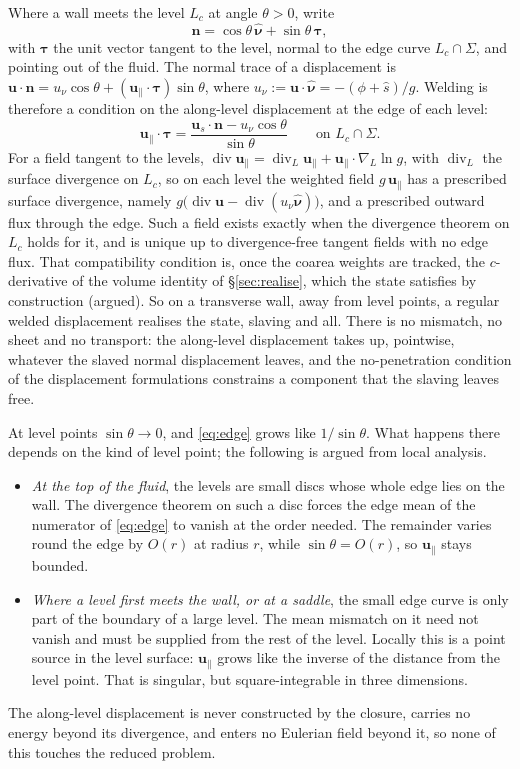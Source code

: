 \documentclass[11pt]{article}
\theoremstyle{definition}
\theoremstyle{remark}
\newcommand{\bu}{\mathbf{u}}
\newcommand{\bn}{\mathbf{n}}
\newcommand{\btau}{\boldsymbol{\tau}}
\newcommand{\Div}{\operatorname{div}}
\newcommand{\nuh}{\hat{\boldsymbol{\nu}}}
\begin{document}
Where a wall meets the level $L_c$ at angle $\theta > 0$, write
\begin{equation*}
  \bn = \cos\theta\,\nuh + \sin\theta\,\btau ,
\end{equation*}
with $\btau$ the unit vector tangent to the level, normal to the edge
curve $L_c\cap\Sigma$, and pointing out of the fluid. The normal trace
of a displacement is $\bu\cdot\bn = u_\nu\cos\theta +
(\bu_\parallel\cdot\btau)\sin\theta$, where $u_\nu := \bu\cdot\nuh =
-(\phi + \hat s)/g$. Welding is therefore a condition on the
along-level displacement at the edge of each level:
\begin{equation}
  \bu_\parallel\cdot\btau = \frac{\bu_s\cdot\bn - u_\nu\cos\theta}{\sin\theta}
  \qquad\text{on } L_c\cap\Sigma .
  \label{eq:edge}
\end{equation}
For a field tangent to the levels, $\Div\bu_\parallel =
\Div_L\bu_\parallel + \bu_\parallel\cdot\nabla_L\ln g$, with $\Div_L$
the surface divergence on $L_c$, so on each level the weighted field
$g\,\bu_\parallel$ has a prescribed surface divergence, namely
$g\bigl(\Div\bu - \Div(u_\nu\nuh)\bigr)$, and a prescribed outward flux
through the edge. Such a field exists exactly when the divergence
theorem on $L_c$ holds for it, and is unique up to divergence-free
tangent fields with no edge flux. That compatibility condition is,
once the coarea weights are tracked, the $c$-derivative of the volume
identity of \S\ref{sec:realise}, which the state satisfies by
construction (argued). So on a transverse wall, away from level
points, a regular welded displacement realises the state, slaving and
all. There is no mismatch, no sheet and no transport: the along-level
displacement takes up, pointwise, whatever the slaved normal
displacement leaves, and the no-penetration condition of the
displacement formulations constrains a component that the slaving
leaves free.

At level points $\sin\theta \to 0$, and \eqref{eq:edge} grows like
$1/\sin\theta$. What happens there depends on the kind of level point;
the following is argued from local analysis.
\begin{itemize}
\item \emph{At the top of the fluid}, the levels are small discs whose
  whole edge lies on the wall. The divergence theorem on such a disc
  forces the edge mean of the numerator of \eqref{eq:edge} to vanish at
  the order needed. The remainder varies round the edge by $O(r)$ at
  radius $r$, while $\sin\theta = O(r)$, so $\bu_\parallel$ stays
  bounded.
\item \emph{Where a level first meets the wall, or at a saddle}, the
  small edge curve is only part of the boundary of a large level. The
  mean mismatch on it need not vanish and must be supplied from the
  rest of the level. Locally this is a point source in the level
  surface: $\bu_\parallel$ grows like the inverse of the distance from
  the level point. That is singular, but square-integrable in three
  dimensions.
\end{itemize}
The along-level displacement is never constructed by the
closure, carries no energy beyond its divergence, and enters no
Eulerian field beyond it, so none of this touches the reduced problem.
\end{document}
